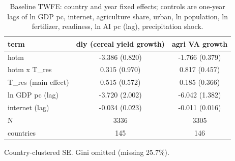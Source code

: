 \begin{table}[htbp]
\centering
\caption{Baseline TWFE: country and year fixed effects; controls are one-year lags of ln GDP pc, internet, agriculture share, urban, ln population, ln fertilizer, readiness, ln AI pc (lag), precipitation shock.}
\label{tab:agri_baseline}
\begin{tabular}{lcc}
\toprule
term & dly (cereal yield growth) & agri VA growth \\
\midrule
hotm & -3.386 (0.820) & -1.766 (0.379) \\
hotm x T\_res & 0.315 (0.970) & 0.817 (0.457) \\
T\_res (main effect) & 0.515 (0.572) & 0.185 (0.366) \\
ln GDP pc (lag) & -3.720 (2.002) & -6.042 (1.382) \\
internet (lag) & -0.034 (0.023) & -0.011 (0.016) \\
N & 3336 & 3305 \\
countries & 145 & 146 \\
\bottomrule
\end{tabular}
\par\smallskip\footnotesize Country-clustered SE. Gini omitted (missing 25.7\%).
\end{table}
